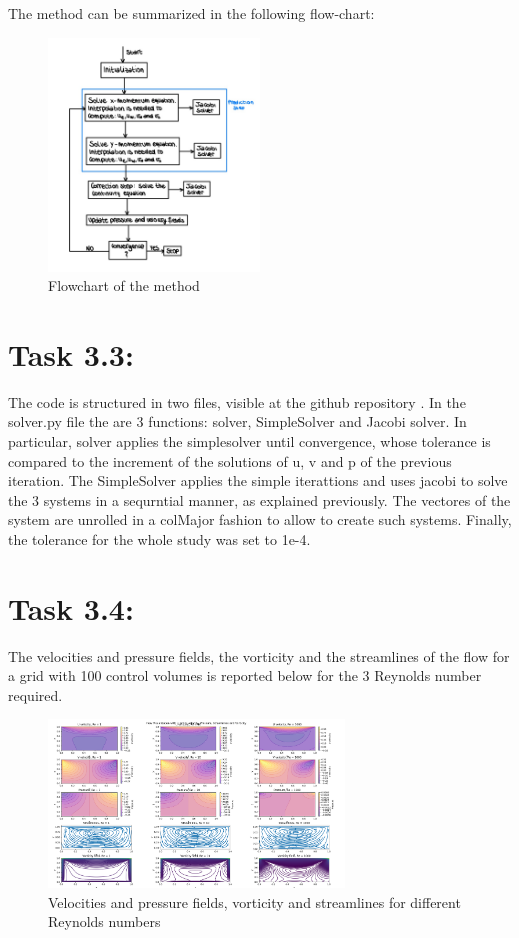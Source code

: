 \documentclass{article}
\begin{document}
The method can be summarized in the following flow-chart:
\begin{figure}[h!]
  \centering
  \includegraphics[width=0.5\textwidth]{graph.jpg}
  \caption{Flowchart of the method}
\end{figure}

\section*{\Large Task 3.3:}
The code is structured in two files, visible at the github repository \cite{GitHubRepo}. In the solver.py file the are 3 functions: solver, SimpleSolver and Jacobi solver. 
In particular, solver applies the simplesolver until convergence, whose tolerance is compared to the increment of the solutions of u, v and p of the previous iteration.
The SimpleSolver applies the simple iterattions and uses jacobi to solve the 3 systems in a sequrntial manner, as explained previously. The vectores of the system are unrolled in a colMajor fashion to allow to create such systems.
Finally, the tolerance for the whole study was set to 1e-4.
\section*{\Large Task 3.4:}
The velocities and pressure fields, the vorticity and the streamlines of the flow for a grid with 100 control volumes is reported below for the 3 Reynolds number required.
\begin{figure}[h!]
  \centering
  \includegraphics[width=0.7\textwidth]{Task4.png}
  \caption{Velocities and pressure fields, vorticity and streamlines for different Reynolds numbers}
\end{figure}
\end{document}
